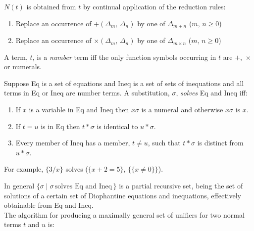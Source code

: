 \documentclass[letterpaper]{report}
\begin{document}
$N(t)$ is obtained from $t$ by continual application of the
reduction rules:

\begin{enumerate}
	\def\labelenumi{(\arabic{enumi})}
	\item
	Replace an occurrence of $+(\Delta_{m},\,\Delta_{n})$ by one of
	$\Delta_{m+n}$ \quad($m,\,n \geqslant 0$)
	\item
	Replace an occurrence of $\times(\Delta_{m},\,\Delta_{n})$ by one of
	$\Delta_{m\times n}$ \quad($m,\,n \geqslant 0$)
\end{enumerate}

A term, $t$, is a \emph{number} term iff the only function symbols
occurring in $t$ are $+,\,\times$ or numerals.

Suppose Eq is a set of equations and Ineq is a set of sets of
inequations and all terms in Eq or Ineq are number terms. A
substitution, $\sigma$, \emph{solves} Eq and Ineq iff:

\begin{enumerate}
	\def\labelenumi{(\arabic{enumi})}
	\item
	If $x$ is a variable in Eq and Ineq then $x\sigma$ is a numeral
	and otherwise $x\sigma$ is $x$.
	\item
	If $t = u$ is in Eq then $t\ast\sigma$ is identical to $u\ast\sigma$.
	\item
	Every member of Ineq has a member, $t \neq u$, such that
	$t\ast\sigma$ is distinct from $u\ast\sigma$.
\end{enumerate}

For example, $\{3/x\}$ solves ($\{x + 2 = 5\}$,
$\{\{x \neq 0\}\}$).

In general $\{\sigma\mid \sigma\,\mbox{solves Eq and Ineq}\,\}$ is a
partial recursive set, being the set of solutions of a certain set of
Diophantine equations and inequations, effectively obtainable from Eq
and Ineq.\\
The algorithm for producing a maximally general set of unifiers for two
normal terms $t$ and $u$ is:
\end{document}
